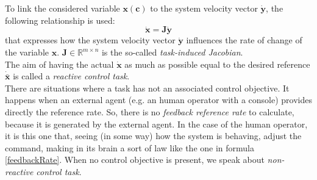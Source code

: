 To link the considered variable $ \boldsymbol{x}(\boldsymbol{c})$ to the system velocity vector $\dot{\boldsymbol{y}}$, the following relationship is used:
\begin{equation}
\label{eq:CartJacVel}
	\dot{\boldsymbol{x}} = \boldsymbol{J} \dot{\boldsymbol{y}}
\end{equation} 
that expresses how the system velocity vector $\dot{\boldsymbol{y}}$ influences the rate of change of the variable $\boldsymbol{x}$. $ \boldsymbol{J} \in \mathbb{R}^{m \times n}$ is the so-called \textit{task-induced Jacobian}.\\
The aim of having the actual $\dot{\boldsymbol{x}}$ as much as possible equal to the desired reference $\dot{\bar{\boldsymbol{x}}}$ is called a \textit{reactive control task}.\\

There are situations where a task has not an associated control objective. It happens when an external agent (e.g. an human operator with a console) provides directly the reference rate. So, there is no \textit{feedback reference rate} to calculate, because it is generated by the external agent. In the case of the human operator, it is this one that, seeing (in some way) how the system is behaving, adjust the command, making in its brain a sort of law like the one in formula \eqref{feedbackRate}.  When no control objective is present, we speak about \textit{non-reactive control task}.


